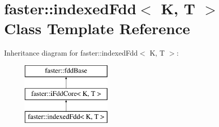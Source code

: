 \hypertarget{classfaster_1_1indexedFdd}{}\section{faster\+:\+:indexed\+Fdd$<$ K, T $>$ Class Template Reference}
\label{classfaster_1_1indexedFdd}
Inheritance diagram for faster\+:\+:indexed\+Fdd$<$ K, T $>$\+:\begin{figure}[H]
\begin{center}
\leavevmode
\includegraphics[height=3.000000cm]{classfaster_1_1indexedFdd}
\end{center}
\end{figure}
